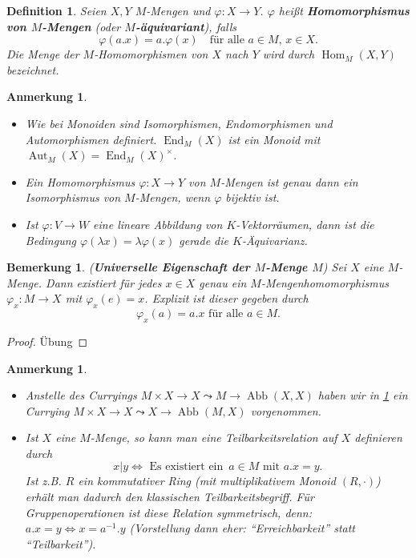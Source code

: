 \documentclass[a4paper, twoside, 11pt, ngerman]{report}
\DeclareMathOperator{\Abb}{Abb}
\DeclareMathOperator{\Aut}{Aut}
\DeclareMathOperator{\End}{End}
\DeclareMathOperator{\Hom}{Hom}
\theoremstyle{definistyle}
\newtheorem{defini}[satz]{Definition}
\newtheorem{bem}[satz]{Bemerkung}
\newtheorem{anm}[satz]{Anmerkung}
\theoremstyle{remark}
\newcommand{\defn}[1]{\textit{\bfseries #1}}
\begin{document}
\begin{defini}\label{def:hom_mengen}
Seien $X, Y$ $M$-Mengen und $\varphi \colon X \to Y$. $\varphi$ heißt \defn{Homomorphismus von $M$-Mengen} (oder \defn{$M$-äquivariant}), falls
\[
\varphi(a . x) = a . \varphi(x) \quad \text{für alle } a \in M, \, x \in X.
\]
Die Menge der $M$-Homomorphismen von $X$ nach $Y$ wird durch $\Hom_M(X, Y)$ bezeichnet.
\end{defini}

\begin{anm}\label{anm:iso_end_auto}
\begin{itemize}
    \item Wie bei Monoiden sind Isomorphismen, Endomorphismen und Automorphismen definiert. $\End_M(X)$ ist ein Monoid mit $\Aut_M(X) = \End_M(X)^\times$.

    \item Ein Homomorphismus $\varphi \colon X \to Y$ von $M$-Mengen ist genau dann ein Isomorphismus von $M$-Mengen, wenn $\varphi$ bijektiv ist.


    \item Ist $\varphi \colon V \to W$ eine lineare Abbildung von $K$-Vektorräumen, dann ist die Bedingung $\varphi(\lambda x) = \lambda \varphi(x)$ gerade die $K$-Äquivarianz.
\end{itemize}
\end{anm}

\begin{bem}\label{bem:univ_eig}
(\defn{Universelle Eigenschaft der $M$-Menge $M$}) Sei $X$ eine $M$-Menge. Dann existiert für jedes $x \in X$ genau ein $M$-Mengenhomomorphismus $\varphi_x \colon M \to X$ mit $\varphi_x(e) = x$. 
Explizit ist dieser gegeben durch \[\varphi_x(a) = a . x \text { für alle } a \in M.\]
\end{bem}

\begin{proof}
Übung
\end{proof}

\begin{anm}\label{anm:currying_variante}
\begin{itemize}
\item Anstelle des Curryings $M \times X \to X \leadsto M \to \Abb(X, X)$ haben wir in \ref{bem:univ_eig} ein Currying $M \times X \to X \leadsto X \to \Abb(M, X)$ vorgenommen.
    \item Ist $X$ eine $M$-Menge, so kann man eine Teilbarkeitsrelation auf $X$ definieren durch 
    \[x | y \Leftrightarrow \text{ Es existiert ein } \, a \in M \text { mit } a. x = y.\]
     Ist z.B. $R$ ein kommutativer Ring (mit multiplikativem Monoid $(R, \cdot)$)
     erhält man dadurch den klassischen Teilbarkeitsbegriff. Für Gruppenoperationen ist diese Relation symmetrisch, denn: $a . x = y \iff x = a^{-1} . y$ (Vorstellung dann eher: "`Erreichbarkeit"' statt "`Teilbarkeit"').
\end{itemize}
\end{anm}
\end{document}
